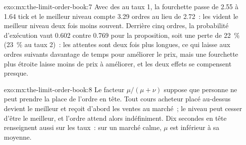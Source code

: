 \begin{solution}{exo:mx:the-limit-order-book:7}
Avec des  au taux 1, la fourchette passe de 2.55 à 1.64 tick et le meilleur niveau compte 3.29 ordres au lieu de 2.72~: les  vident
le meilleur niveau deux fois moins souvent. Derrière cinq ordres, la probabilité d'exécution vaut 0.602 contre 0.769 pour la proposition, soit une perte de 22~\% (23~\% au taux 2)~: les attentes
sont deux fois plus longues, ce qui laisse aux ordres suivants davantage de temps pour améliorer le prix, mais une fourchette plus étroite laisse moins de prix à améliorer, et les deux
effets se compensent presque.
\end{solution}

\begin{solution}{exo:mx:the-limit-order-book:8}
Le facteur $\mu/(\mu+\nu)$ suppose que personne ne peut prendre la place de l'ordre en tête. Tout cours acheteur placé au-dessus devient le meilleur et reçoit d'abord les ventes au marché~;
le niveau peut cesser d'être le meilleur, et l'ordre attend alors indéfiniment. Dix secondes en tête renseignent aussi sur les taux~:
sur un marché calme, $\mu$ est inférieur à sa moyenne.
\end{solution}

